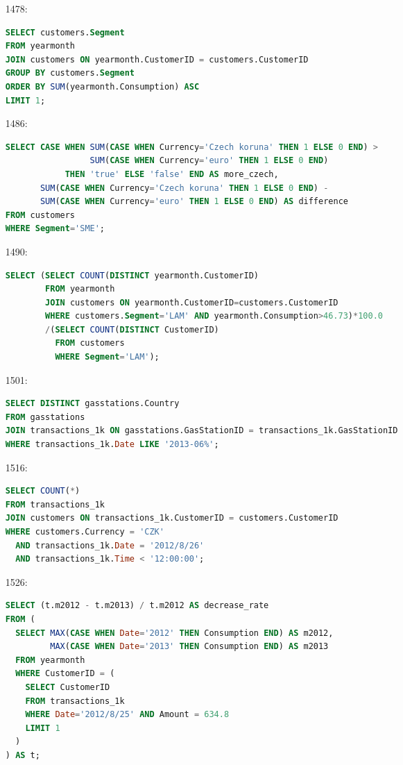 \documentclass[11pt]{article}
\begin{document}
\begin{enumerate}
\item[1478:]
\begin{lstlisting}[language=SQL]
SELECT customers.Segment
FROM yearmonth
JOIN customers ON yearmonth.CustomerID = customers.CustomerID
GROUP BY customers.Segment
ORDER BY SUM(yearmonth.Consumption) ASC
LIMIT 1;
\end{lstlisting}

\item[1486:]
\begin{lstlisting}[language=SQL]
SELECT CASE WHEN SUM(CASE WHEN Currency='Czech koruna' THEN 1 ELSE 0 END) >
                 SUM(CASE WHEN Currency='euro' THEN 1 ELSE 0 END)
            THEN 'true' ELSE 'false' END AS more_czech,
       SUM(CASE WHEN Currency='Czech koruna' THEN 1 ELSE 0 END) -
       SUM(CASE WHEN Currency='euro' THEN 1 ELSE 0 END) AS difference
FROM customers
WHERE Segment='SME';
\end{lstlisting}

\item[1490:]
\begin{lstlisting}[language=SQL]
SELECT (SELECT COUNT(DISTINCT yearmonth.CustomerID)
        FROM yearmonth
        JOIN customers ON yearmonth.CustomerID=customers.CustomerID
        WHERE customers.Segment='LAM' AND yearmonth.Consumption>46.73)*100.0
        /(SELECT COUNT(DISTINCT CustomerID)
          FROM customers
          WHERE Segment='LAM');
\end{lstlisting}

\item[1501:]
\begin{adjustbox}{max width=\textwidth}
\begin{lstlisting}[language=SQL]
SELECT DISTINCT gasstations.Country
FROM gasstations
JOIN transactions_1k ON gasstations.GasStationID = transactions_1k.GasStationID
WHERE transactions_1k.Date LIKE '2013-06%';
\end{lstlisting}
\end{adjustbox}

\item[1516:]
\begin{lstlisting}[language=SQL]
SELECT COUNT(*)
FROM transactions_1k
JOIN customers ON transactions_1k.CustomerID = customers.CustomerID
WHERE customers.Currency = 'CZK'
  AND transactions_1k.Date = '2012/8/26'
  AND transactions_1k.Time < '12:00:00';
\end{lstlisting}

\item[1526:]
\begin{lstlisting}[language=SQL]
SELECT (t.m2012 - t.m2013) / t.m2012 AS decrease_rate
FROM (
  SELECT MAX(CASE WHEN Date='2012' THEN Consumption END) AS m2012,
         MAX(CASE WHEN Date='2013' THEN Consumption END) AS m2013
  FROM yearmonth
  WHERE CustomerID = (
    SELECT CustomerID
    FROM transactions_1k
    WHERE Date='2012/8/25' AND Amount = 634.8
    LIMIT 1
  )
) AS t;
\end{lstlisting}


\end{enumerate}
\end{document}
